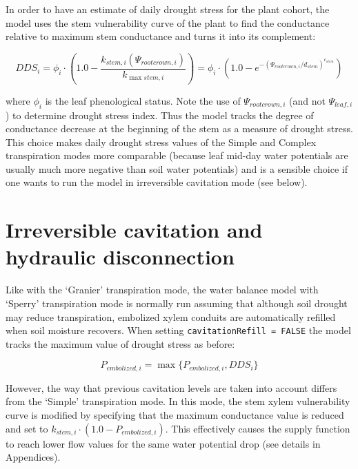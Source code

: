 \documentclass[]{book}
\begin{document}
In order to have an estimate of daily drought stress for the plant
cohort, the model uses the stem vulnerability curve of the plant to find
the conductance relative to maximum stem conductance and turns it into
its complement:

\begin{equation}
DDS_i = \phi_i \cdot \left( 1.0 - \frac{k_{stem, i}(\Psi_{rootcrown,i})}{k_{\max stem, i}}\right) = \phi_i \cdot \left(1.0 - e^{-(\Psi_{rootcrown,i}/d_{stem})^{c_{stem}}}\right)
\end{equation}

where \(\phi_i\) is the leaf phenological status. Note the use of
\(\Psi_{rootcrown,i}\) (and not \(\Psi_{leaf,i}\)) to determine drought
stress index. Thus the model tracks the degree of conductance decrease
at the beginning of the stem as a measure of drought stress. This choice
makes daily drought stress values of the Simple and Complex
transpiration modes more comparable (because leaf mid-day water
potentials are usually much more negative than soil water potentials)
and is a sensible choice if one wants to run the model in irreversible
cavitation mode (see below).

\section{Irreversible cavitation and hydraulic
disconnection}\label{irreversible-cavitation-and-hydraulic-disconnection-1}

Like with the `Granier' transpiration mode, the water balance model with
`Sperry' transpiration mode is normally run assuming that although soil
drought may reduce transpiration, embolized xylem conduits are
automatically refilled when soil moisture recovers. When setting
\texttt{cavitationRefill = FALSE} the model tracks the maximum value of
drought stress as before:

\begin{equation}
P_{embolized,i}= \max \{P_{embolized,i}, DDS_i \}
\end{equation}

However, the way that previous cavitation levels are taken into account
differs from the `Simple' transpiration mode. In this mode, the stem
xylem vulnerability curve is modified by specifying that the maximum
conductance value is reduced and set to
\(k_{stem,i} \cdot (1.0 - P_{embolized,i})\). This effectively causes
the supply function to reach lower flow values for the same water
potential drop (see details in Appendices).
\end{document}
